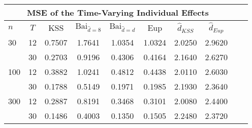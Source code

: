 \begin{tabular}{lccccccccc} 
\hline \multicolumn{8}{c}{MSE of the Time-Varying Individual Effects} \\ \hline 
$n$ & $T$ & KSS & $ \text{Bai}_{\hat{d} = 8}$ & $\text{Bai}_{\hat{d} = d}$ & Eup & $\hat{d}_{KSS}$ & $\hat{d}_{Eup}$ \\
\hline
30 & 12 &  0.7507  &  1.7641  &  1.0354  &  1.0324  &  2.0250  &  2.9620  \\
& 30 &  0.2703  &  0.9196  &  0.4306  &  0.4164  &  2.1640  &  2.6270  \\
100 & 12 &  0.3882  &  1.0241  &  0.4812  &  0.4438  &  2.0110  &  2.6030  \\
& 30 &  0.1788  &  0.5149  &  0.1971  &  0.1985  &  2.1930  &  2.3640  \\
300 & 12 &  0.2887  &  0.8191  &  0.3468  &  0.3101  &  2.0080  &  2.4400  \\
& 30 &  0.1486  &  0.4003  &  0.1350  &  0.1505  &  2.2480  &  2.3720  \\
\end{tabular} 

